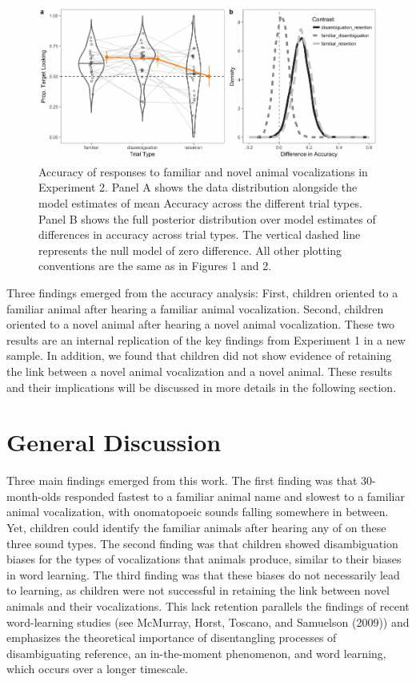 \documentclass[english,floatsintext,man]{apa6}
\theoremstyle{definition}
\theoremstyle{definition}
\theoremstyle{definition}
\theoremstyle{remark}
\begin{document}
\begin{figure}[tb]
\includegraphics[width=0.95\linewidth]{anime_manuscript_files/figure-latex/acc-plot-e2-1} \caption{Accuracy of responses to familiar and novel animal vocalizations in Experiment 2. Panel A shows the data distribution alongside the model estimates of mean Accuracy across the different trial types. Panel B shows the full posterior distribution over model estimates of differences in accuracy across trial types. The vertical dashed line represents the null model of zero difference. All other plotting conventions are the same as in Figures 1 and 2.}\label{fig:acc-plot-e2}
\end{figure}

Three findings emerged from the accuracy analysis: First, children
oriented to a familiar animal after hearing a familiar animal
vocalization. Second, children oriented to a novel animal after hearing
a novel animal vocalization. These two results are an internal
replication of the key findings from Experiment 1 in a new sample. In
addition, we found that children did not show evidence of retaining the
link between a novel animal vocalization and a novel animal. These
results and their implications will be discussed in more details in the
following section.

\section{General Discussion}\label{general-discussion}

Three main findings emerged from this work. The first finding was that
30-month-olds responded fastest to a familiar animal name and slowest to
a familiar animal vocalization, with onomatopoeic sounds falling
somewhere in between. Yet, children could identify the familiar animals
after hearing any of on these three sound types. The second finding was
that children showed disambiguation biases for the types of
vocalizations that animals produce, similar to their biases in word
learning. The third finding was that these biases do not necessarily
lead to learning, as children were not successful in retaining the link
between novel animals and their vocalizations. This lack retention
parallels the findings of recent word-learning studies (see McMurray,
Horst, Toscano, and Samuelson (2009)) and emphasizes the theoretical
importance of disentangling processes of disambiguating reference, an
in-the-moment phenomenon, and word learning, which occurs over a longer
timescale.
\end{document}
